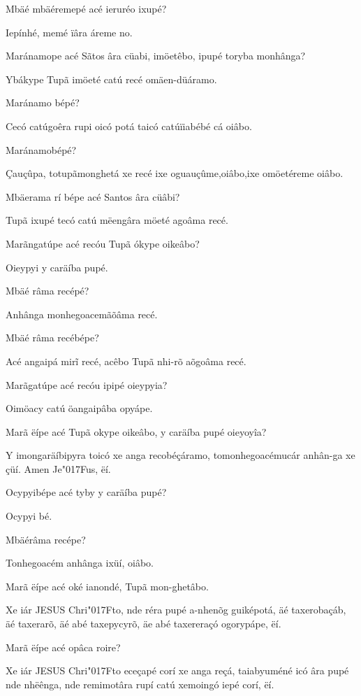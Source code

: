 \documentclass[openany,titlepage,12pt]{book}
\newcommand{\lgS}{\char"017F}
\begin{document}
\begin{alternate}[leftmargin=8pt]
    \item Mbäé mbäéremepé acé ieruréo ixupé?
    \item Iepínhé, memé ïâra áreme no.
    \item Maránamope acé Sãtos âra cüabi, imöetêbo, ipupé
    toryba monhânga?
    \item Ybákype Tupã imöeté catú recé omäen-düáramo.
    \item Maránamo bépé?
    \item Cecó catúgoêra rupi oicó potá taicó catúïiabébé
    cá oiâbo.
    \item Maránamobépé?
    \item Çauçûpa, totupãmonghetá xe recé ixe
    oguauçûme,oiâbo,ixe omöetéreme oiâbo.
    \item Mbäerama rí bépe acé Santos âra cüâbi?
    \item Tupã ixupé tecó catú mëengâra möeté agoâma recé.
    \item Marãngatúpe acé recóu Tupã ókype oikeâbo?
    \item Oieypyi y caräíba pupé.
    \item Mbäé râma recépé?
    \item Anhânga monhegoacemãõâma recé.
    \item Mbäé râma recébépe?
    \item Acé angaipá mirĩ recé, acêbo Tupã nhi-rõ aõgoâma recé.
    \item Marãgatúpe acé recóu ipipé oieypyia?
    \item Oimöacy catú öangaipâba opyápe.
    \item Marã ëípe acé Tupã okype oikeâbo, y caräíba pupé 
    oieyoyîa? 
    \item Y imongaräíbipyra toicó xe anga 
    recobéçáramo, tomonhegoacémucár anhân-ga xe çüí. Amen 
    Je\lgS us, ëí.
    \item Ocypyibépe acé tyby y caräíba pupé?
    \item Ocypyi bé.
    \item Mbäérâma recépe?
    \item Tonhegoacém anhânga ixüí, oiâbo.
    \item Marã ëípe acé oké ianondé, Tupã mon-ghetâbo.
    \item Xe iár JESUS Chri\lgS to, nde réra pupé a-nhenõg
    guiképotá, äé taxerobaçáb, äé taxerarõ, äé abé taxepycyrõ,
    äe abé taxereraçó ogorypápe, ëí.
    \item Marã ëípe acé opâca roire?
    \item Xe iár JESUS Chri\lgS to eceçapé corí xe\linebreak
    anga reçá, taiabyuméné icó âra pupé nde nhëênga,
    nde remimotâra rupí catú xe\linebreak moingó iepé corí, ëí.
\end{alternate}
\end{document}
